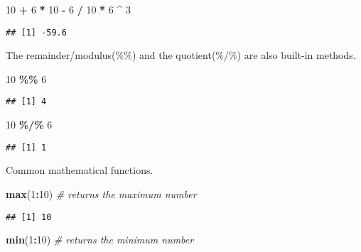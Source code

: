 \documentclass[
  12pt,
]{article}
\newenvironment{Shaded}{\begin{snugshade}}{\end{snugshade}}
\newcommand{\CommentTok}[1]{\textcolor[rgb]{0.56,0.35,0.01}{\textit{#1}}}
\newcommand{\DecValTok}[1]{\textcolor[rgb]{0.00,0.00,0.81}{#1}}
\newcommand{\FunctionTok}[1]{\textcolor[rgb]{0.13,0.29,0.53}{\textbf{#1}}}
\newcommand{\NormalTok}[1]{#1}
\newcommand{\SpecialCharTok}[1]{\textcolor[rgb]{0.81,0.36,0.00}{\textbf{#1}}}
\begin{document}
\begin{Shaded}
\begin{Highlighting}[]
\DecValTok{10} \SpecialCharTok{+} \DecValTok{6} \SpecialCharTok{*} \DecValTok{10} \SpecialCharTok{{-}} \DecValTok{6} \SpecialCharTok{/} \DecValTok{10} \SpecialCharTok{*} \DecValTok{6} \SpecialCharTok{\^{}} \DecValTok{3}
\end{Highlighting}
\end{Shaded}

\begin{verbatim}
## [1] -59.6
\end{verbatim}

The remainder/modulus(\%\%) and the quotient(\%/\%) are also built-in
methods.

\begin{Shaded}
\begin{Highlighting}[]
\DecValTok{10} \SpecialCharTok{\%\%} \DecValTok{6}
\end{Highlighting}
\end{Shaded}

\begin{verbatim}
## [1] 4
\end{verbatim}

\begin{Shaded}
\begin{Highlighting}[]
\DecValTok{10} \SpecialCharTok{\%/\%} \DecValTok{6}
\end{Highlighting}
\end{Shaded}

\begin{verbatim}
## [1] 1
\end{verbatim}

Common mathematical functions.

\begin{Shaded}
\begin{Highlighting}[]
\FunctionTok{max}\NormalTok{(}\DecValTok{1}\SpecialCharTok{:}\DecValTok{10}\NormalTok{)       }\CommentTok{\# returns the maximum number}
\end{Highlighting}
\end{Shaded}

\begin{verbatim}
## [1] 10
\end{verbatim}

\begin{Shaded}
\begin{Highlighting}[]
\FunctionTok{min}\NormalTok{(}\DecValTok{1}\SpecialCharTok{:}\DecValTok{10}\NormalTok{)       }\CommentTok{\# returns the minimum number}
\end{Highlighting}
\end{Shaded}
\end{document}
